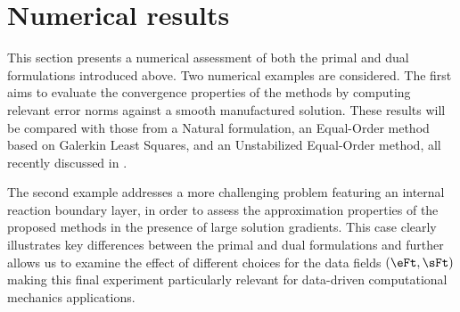 
\section{Numerical results}

This section presents a numerical assessment of both the primal and dual formulations introduced above. Two numerical examples are considered. The first aims to evaluate the convergence properties of the methods by computing relevant error norms against a smooth manufactured solution. These results will be compared with those from a Natural formulation, an Equal-Order method based on Galerkin Least Squares, and an Unstabilized Equal-Order method, all recently discussed in \cite{Balbao2025}.

The second example addresses a more challenging problem featuring an internal reaction boundary layer, in order to assess the approximation properties of the proposed methods in the presence of large solution gradients. This case clearly illustrates key differences between the primal and dual formulations and further allows us to examine the effect of different choices for the data fields $(\eFt,\sFt)$ making this final experiment particularly relevant for data-driven computational mechanics applications.

